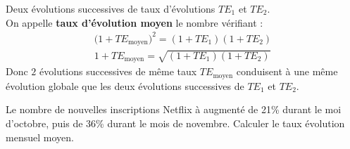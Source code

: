 \documentclass[main.tex]{subfiles}
\begin{document}
\begin{eBox}  Deux évolutions successives de taux d'évolutions $TE_1$ et $TE_2$.\\
	 On appelle   \textbf{taux d'évolution moyen} le nombre vérifiant : 
	\setlength{\abovedisplayskip}{3pt} 
	\setlength{\belowdisplayskip}{3pt} 
	\begin{gather*} 
	\big(1+TE_{\text{moyen}}\big)^2   = (1+TE_1 )   (1+TE_2)\\
	1+TE_{\text{moyen}}=\sqrt{ (1+TE_1 )   (1+TE_2)}
	\end{gather*}
	Donc $2$ évolutions successives de même taux $TE_{\text{moyen}}$ conduisent à une même évolution globale que les deux évolutions successives de $TE_1$ et $TE_2$.
\end{eBox}  

\begin{exercise} \hfill 
	
	\noindent		Le nombre de nouvelles inscriptions Netflix à augmenté de 21\% durant le moi d'octobre, puis de 36\% durant le mois de novembre.
	Calculer le taux évolution mensuel moyen.
\end{exercise}  
\end{document}
